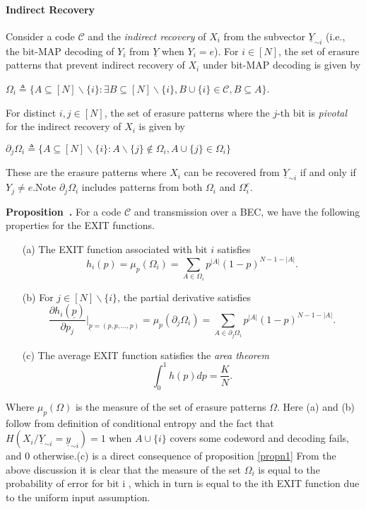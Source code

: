 \documentclass[
11pt, %
a4paper, %
oneside, %
headinclude,footinclude, %
BCOR5mm, %
]{scrartcl}
\newenvironment{proposition}[1][]{\refstepcounter{definition}\par\medskip
   \noindent \textbf{Proposition~\thedefinition. #1} \rmfamily}{\medskip}
\begin{document}
\paragraph{Indirect Recovery} Consider a code $\mathcal{C}$ and the \emph{indirect recovery} of $X_i$ from the subvector $\underline{Y}_{\sim i}$ (i.e., the bit-MAP decoding of $Y_i$ from $\underline{Y}$ when $Y_i=e$). For $i \in [N]$, the set of erasure patterns that prevent indirect recovery of $X_i$ under bit-MAP decoding is given by 
\begin{definition}
$\Omega_i \triangleq \{A \subseteq [N]\backslash\{i\} : \exists B \subseteq [N]\backslash\{i\}, B \cup \{i\} \in \mathcal{C}, B \subseteq A\}$.
\label{defn2}
\end{definition}
For distinct $i,j \in [N]$, the set of erasure patterns where the $j$-th bit is \emph{pivotal} for the indirect recovery of $X_i$ is given by 
\begin{definition}
$\partial_j\Omega_i \triangleq \{A \subseteq [N]\backslash\{i\}: A\backslash \{j\} \notin \Omega_i, A \cup \{j\} \in \Omega_i \}$
\end{definition}
These are the erasure patterns where $X_i$ can be recovered from $\underline{Y}_{\sim i}$ if and only if $Y_j \neq e$.Note $\partial_j\Omega_i$ includes patterns from both $\Omega_i$ and $\Omega_i^c$.
\begin{proposition}
\label{propn4}
For a code $\mathcal{C}$ and transmission over a BEC, we have the following properties for the EXIT functions.
\begin{enumerate}
\item[(a)] The EXIT function associated with bit $i$ satisfies $$h_i(p) = \mu_{p}(\Omega_i)= \sum_{A \in \Omega_i} p^{|A|}(1-p)^{N-1-|A|}.$$
\item[(b)] For $j \in [N]\backslash\{i\}$, the partial derivative satisfies $$\frac{\partial h_i(\underline{p})}{\partial p_j}\Bigg|_{\underline{p}=(p,p,\ldots,p)} =\mu_{p}(\partial_j\Omega_i)= \sum_{A \in \partial_j\Omega_i} p^{|A|}(1-p)^{N-1-|A|}.$$
\item[(c)]The average EXIT function satisfies the \emph{area theorem} $$\int_0^1 h(p)dp = \frac{K}{N}.$$
\end{enumerate}
Where $\mu_{p}(\Omega)$ is the measure of the set of erasure patterns $\Omega$.
Here (a) and (b) follow from definition of conditional entropy and the fact that $H(X_i/\underline{Y}_{\sim i}=\underline{y}_{\sim i})=1$ when $A \cup \{i\}$ covers some codeword and decoding fails, and $0$ otherwise.(c) is a direct consequence of proposition \ref{propn1}
\end{proposition}
From the above discussion it is clear that the measure of the set $\Omega_i$ is equal to the probability of error for bit i , which in turn is equal to the ith EXIT function due to the uniform input assumption.
\end{document}
